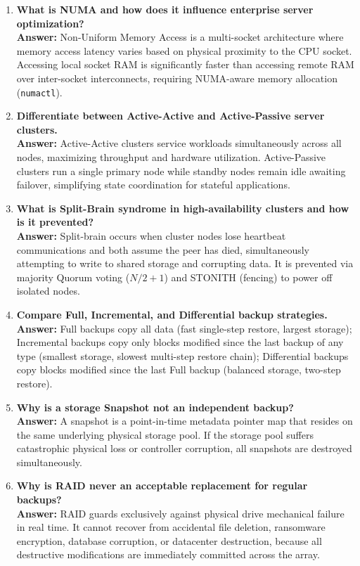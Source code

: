 \begin{enumerate}[label=\textbf{Q\arabic*.},leftmargin=1.2cm]
\item \textbf{What is NUMA and how does it influence enterprise server optimization?} \\
\textbf{Answer:} Non-Uniform Memory Access is a multi-socket architecture where memory access latency varies based on physical proximity to the CPU socket. Accessing local socket RAM is significantly faster than accessing remote RAM over inter-socket interconnects, requiring NUMA-aware memory allocation (\texttt{numactl}).

\item \textbf{Differentiate between Active-Active and Active-Passive server clusters.} \\
\textbf{Answer:} Active-Active clusters service workloads simultaneously across all nodes, maximizing throughput and hardware utilization. Active-Passive clusters run a single primary node while standby nodes remain idle awaiting failover, simplifying state coordination for stateful applications.

\item \textbf{What is Split-Brain syndrome in high-availability clusters and how is it prevented?} \\
\textbf{Answer:} Split-brain occurs when cluster nodes lose heartbeat communications and both assume the peer has died, simultaneously attempting to write to shared storage and corrupting data. It is prevented via majority Quorum voting ($N/2 + 1$) and STONITH (fencing) to power off isolated nodes.

\item \textbf{Compare Full, Incremental, and Differential backup strategies.} \\
\textbf{Answer:} Full backups copy all data (fast single-step restore, largest storage); Incremental backups copy only blocks modified since the last backup of any type (smallest storage, slowest multi-step restore chain); Differential backups copy blocks modified since the last Full backup (balanced storage, two-step restore).

\item \textbf{Why is a storage Snapshot not an independent backup?} \\
\textbf{Answer:} A snapshot is a point-in-time metadata pointer map that resides on the same underlying physical storage pool. If the storage pool suffers catastrophic physical loss or controller corruption, all snapshots are destroyed simultaneously.

\item \textbf{Why is RAID never an acceptable replacement for regular backups?} \\
\textbf{Answer:} RAID guards exclusively against physical drive mechanical failure in real time. It cannot recover from accidental file deletion, ransomware encryption, database corruption, or datacenter destruction, because all destructive modifications are immediately committed across the array.


\end{enumerate}
